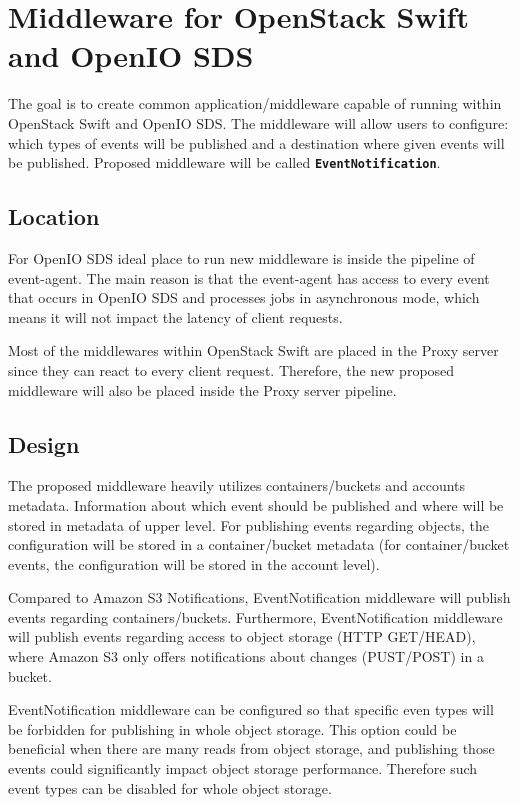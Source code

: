 \section{Middleware for OpenStack Swift and OpenIO SDS}
    The goal is to create common application/middleware capable of running within OpenStack Swift and OpenIO SDS. The middleware will allow users to configure: which types of events will be published and a destination where given events will be published. Proposed middleware will be called \textbf{\texttt{EventNotification}}.

    \subsection{Location}
    For OpenIO SDS ideal place to run new middleware is inside the pipeline of event-agent. The main reason is that the event-agent has access to every event that occurs in OpenIO SDS and processes jobs in asynchronous mode, which means it will not impact the latency of client requests.

    Most of the middlewares within OpenStack Swift are placed in the Proxy server since they can react to every client request. Therefore, the new proposed middleware will also be placed inside the Proxy server pipeline.

    \subsection{Design}
    The proposed middleware heavily utilizes containers/buckets and accounts metadata. Information about which event should be published and where will be stored in metadata of upper level. For publishing events regarding objects, the configuration will be stored in a container/bucket metadata (for container/bucket events, the configuration will be stored in the account level).

    Compared to Amazon S3 Notifications, EventNotification middleware will publish events regarding containers/buckets. Furthermore, EventNotification middleware will publish events regarding access to object storage (HTTP GET/HEAD), where Amazon S3 only offers notifications about changes (PUST/POST) in a bucket.

    EventNotification middleware can be configured so that specific even types will be forbidden for publishing in whole object storage. This option could be beneficial when there are many reads from object storage, and publishing those events could significantly impact object storage performance. Therefore such event types can be disabled for whole object storage.

